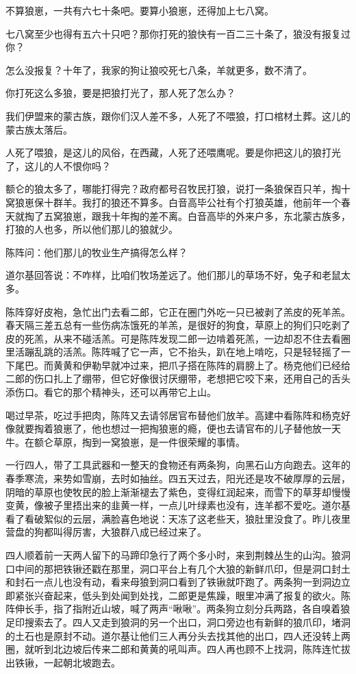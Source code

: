 \par 不算狼崽，一共有六七十条吧。要算小狼崽，还得加上七八窝。
\par 七八窝至少也得有五六十只吧？那你打死的狼快有一百二三十条了，狼没有报复过你？
\par 怎么没报复？十年了，我家的狗让狼咬死七八条，羊就更多，数不清了。
\par 你打死这么多狼，要是把狼打光了，那人死了怎么办？
\par 我们伊盟来的蒙古族，跟你们汉人差不多，人死了不喂狼，打口棺材土葬。这儿的蒙古族太落后。
\par 人死了喂狼，是这儿的风俗，在西藏，人死了还喂鹰呢。要是你把这儿的狼打光了，这儿的人不恨你吗？
\par 额仑的狼太多了，哪能打得完？政府都号召牧民打狼，说打一条狼保百只羊，掏十窝狼崽保十群羊。我打的狼还不算多。白音高毕公社有个打狼英雄，他前年一个春天就掏了五窝狼崽，跟我十年掏的差不离。白音高毕的外来户多，东北蒙古族多，打狼的人也多，所以他们那儿的狼就少。
\par 陈阵问：他们那儿的牧业生产搞得怎么样？
\par 道尔基回答说：不咋样，比咱们牧场差远了。他们那儿的草场不好，兔子和老鼠太多。
\par 陈阵穿好皮袍，急忙出门去看二郎，它正在圈门外吃一只已被剥了羔皮的死羊羔。春天隔三差五总有一些伤病冻饿死的羊羔，是很好的狗食，草原上的狗们只吃剥了皮的死羔，从来不碰活羔。可是陈阵发现二郎一边啃着死羔，一边却忍不住去看圈里活蹦乱跳的活羔。陈阵喊了它一声，它不抬头，趴在地上啃吃，只是轻轻摇了一下尾巴。而黄黄和伊勒早就冲过来，把爪子搭在陈阵的肩膀上了。杨克他们已经给二郎的伤口扎上了绷带，但它好像很讨厌绷带，老想把它咬下来，还用自己的舌头添伤口。看它的那个精神头，还可以再带它上山。
\par 喝过早茶，吃过手把肉，陈阵又去请邻居官布替他们放羊。高建中看陈阵和杨克好像就要掏着狼崽了，他也想过一把掏狼崽的瘾，便也去请官布的儿子替他放一天牛。在额仑草原，掏到一窝狼崽，是一件很荣耀的事情。
\par 一行四人，带了工具武器和一整天的食物还有两条狗，向黑石山方向跑去。这年的春季寒流，来势如雪崩，去时如抽丝。四五天过去，阳光还是攻不破厚厚的云层，阴暗的草原也使牧民的脸上渐渐褪去了紫色，变得红润起来，而雪下的草芽却慢慢变黄，像被子里捂出来的韭黄一样，一点儿叶绿素也没有，连羊都不爱吃。道尔基看了看破絮似的云层，满脸喜色地说：天冻了这老些天，狼肚里没食了。昨儿夜里营盘的狗都叫得厉害，大狼群八成已经过来了。
\par 四人顺着前一天两人留下的马蹄印急行了两个多小时，来到荆棘丛生的山沟。狼洞口中间的那把铁锹还戳在那里，洞口平台上有几个大狼的新鲜爪印，但是洞口封土和封石一点儿也没有动，看来母狼到洞口看到了铁锹就吓跑了。两条狗一到洞边立即紧张兴奋起来，低头到处闻到处找，二郎更是焦躁，眼里冲满了报复的欲火。陈阵伸长手，指了指附近山坡，喊了两声“啾啾”。两条狗立刻分兵两路，各自嗅着狼足印搜索去了。四人又走到狼洞的另一个出口，洞口旁边也有新鲜的狼爪印，堵洞的土石也是原封不动。道尔基让他们三人再分头去找其他的出口，四人还没转上两圈，就听到北边坡后传来二郎和黄黄的吼叫声。四人再也顾不上找洞，陈阵连忙拔出铁锹，一起朝北坡跑去。
